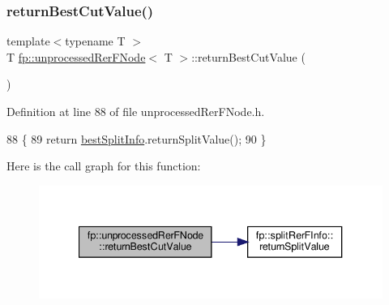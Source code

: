 \mbox{\label{classfp_1_1unprocessedRerFNode_a87211d2d5ab3bc9f3de237870975e382}} 
\subsubsection{\texorpdfstring{return\+Best\+Cut\+Value()}{returnBestCutValue()}}
{\footnotesize\ttfamily template$<$typename T $>$ \\
T \hyperlink{classfp_1_1unprocessedRerFNode}{fp\+::unprocessed\+Rer\+F\+Node}$<$ T $>$\+::return\+Best\+Cut\+Value (\begin{DoxyParamCaption}{ }\end{DoxyParamCaption})\hspace{0.3cm}{\ttfamily [inline]}}



Definition at line 88 of file unprocessed\+Rer\+F\+Node.\+h.


\begin{DoxyCode}
88                                              \{
89                     \textcolor{keywordflow}{return} \hyperlink{classfp_1_1unprocessedRerFNode_acf98051b30cb1c0f2e62bb7df51c0884}{bestSplitInfo}.returnSplitValue();
90                 \}
\end{DoxyCode}
Here is the call graph for this function\+:
\nopagebreak
\begin{figure}[H]
\begin{center}
\leavevmode
\includegraphics[width=340pt]{classfp_1_1unprocessedRerFNode_a87211d2d5ab3bc9f3de237870975e382_cgraph}
\end{center}
\end{figure}
\mbox{\label{classfp_1_1unprocessedRerFNode_a99927a98b98f2924f31cf03ece3b5d50}} 
